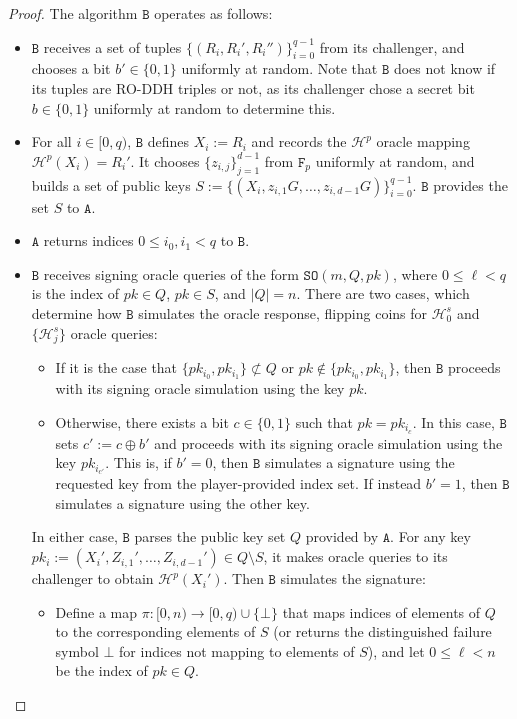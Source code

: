 \documentclass{llncs}
\newcommand{\A}{\texttt{A}}
\newcommand{\B}{\texttt{B}}
\newcommand{\F}{\texttt{F}_p}
\newcommand{\Hp}{\mathcal{H}^p}
\newcommand{\Hs}{\mathcal{H}^s}
\begin{document}
\begin{proof}
The algorithm $\B$ operates as follows:
\begin{itemize}
\item $\B$ receives a set of tuples $\{(R_i,R_i',R_i'')\}_{i=0}^{q-1}$ from its challenger, and chooses a bit $b' \in \{0,1\}$ uniformly at random. Note that $\B$ does not know if its tuples are RO-DDH triples or not, as its challenger chose a secret bit $b \in \{0,1\}$ uniformly at random to determine this.
\item For all $i \in [0,q)$, $\B$ defines $X_i := R_i$ and records the $\Hp$ oracle mapping $\Hp(X_i) = R_i'$. It chooses $\{z_{i,j}\}_{j=1}^{d-1}$ from $\F$ uniformly at random, and builds a set of public keys $S := \{(X_i, z_{i,1}G, \ldots, z_{i,d-1}G)\}_{i=0}^{q-1}$. $\B$ provides the set $S$ to $\A$.
\item $\A$ returns indices $0 \leq i_0,i_1 < q$ to $\B$.
\item $\B$ receives signing oracle queries of the form $\texttt{SO}(m,Q,pk)$, where $0 \leq \ell < q$ is the index of $pk \in Q$, $pk \in S$, and $|Q| = n$. There are two cases, which determine how $\B$ simulates the oracle response, flipping coins for $\Hs_0$ and $\{\Hs_j\}$ oracle queries:
\begin{itemize}
\item If it is the case that $\{pk_{i_0},pk_{i_1}\} \not\subset Q$ or $pk \not\in \{pk_{i_0},pk_{i_1}\}$, then $\B$ proceeds with its signing oracle simulation using the key $pk$.
\item Otherwise, there exists a bit $c \in \{0,1\}$ such that $pk = pk_{i_c}$. In this case, $\B$ sets $c' := c \oplus b'$ and proceeds with its signing oracle simulation using the key $pk_{i_{c'}}$. This is, if $b' = 0$, then $\B$ simulates a signature using the requested key from the player-provided index set. If instead $b' = 1$, then $\B$ simulates a signature using the other key.
\end{itemize}
In either case, $\B$ parses the public key set $Q$ provided by $\A$. For any key $pk_i := (X_i',Z_{i,1}',\ldots,Z_{i,d-1}') \in Q \setminus S$, it makes oracle queries to its challenger to obtain $\Hp(X_i')$. Then $\B$ simulates the signature:
\begin{itemize}
\item Define a map $\pi: [0,n) \to [0,q) \cup \{\bot\}$ that maps indices of elements of $Q$ to the corresponding elements of $S$ (or returns the distinguished failure symbol $\bot$ for indices not mapping to elements of $S$), and let $0 \leq \ell < n$ be the index of $pk \in Q$.

\end{itemize}
\end{itemize}
\end{proof}
\end{document}
